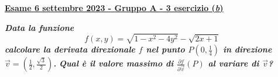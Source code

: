 \documentclass[a4paper]{article}
\newcommand{\definition}[1]{\textcolor{Red3}{\textbf{#1}}}
\newcommand{\example}[1]{\textcolor{Green4}{\textbf{#1}}}
\begin{document}
	\begin{flushleft}\label{exam: esame 06 settembre 2023 - Gruppo A - 3 esercizio (b)}
		\definition{\underline{Esame 6 settembre 2023 - Gruppo A - 3 esercizio (\emph{b})}}
	\end{flushleft}
	\example{\emph{Data la funzione}
	\begin{equation*}
		f\left(x,y\right) = \sqrt{1-x^{2}-4y^{2}} - \sqrt{2x+1}
	\end{equation*}
	\emph{calcolare la derivata direzionale $f$ nel punto $P\left(0,\frac{1}{4}\right)$ in direzione $\overrightarrow{v} = \left(\frac{1}{2}, \frac{\sqrt{3}}{2}\right)$.}}\newline
	\example{\emph{Qual è il valore massimo di $\frac{\partial f}{\partial \overrightarrow{v}}\left(P\right)$ al variare di $\overrightarrow{v}$?}}\newline
\end{document}
